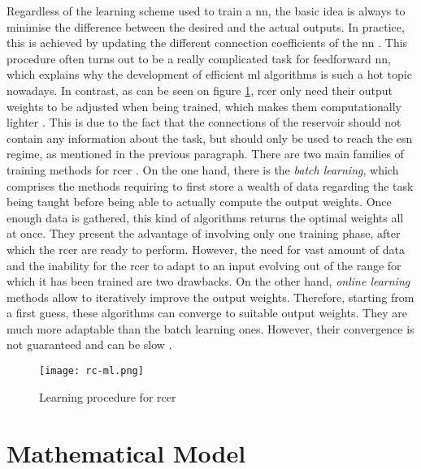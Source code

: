 Regardless of the learning scheme used to train a \gls{nn}, the basic idea is always to minimise the difference between the desired and the actual outputs. In practice, this is achieved by updating the different connection coefficients of the \gls{nn} \cite[p.233]{bishop2006pattern}\cite[p.733]{russell2010artificial}. This procedure often turns out to be a really complicated task for feedforward \gls{nn}, which explains why the development of efficient \gls{ml} algorithms is such a hot topic nowadays. In contrast, as can be seen on figure \ref{rc-ml}, \gls{rcer} only need their output weights to be adjusted when being trained, which makes them computationally lighter \cite{Jaeger2004}. This is due to the fact that the connections of the reservoir should not contain any information about the task, but should only be used to reach the \gls{esn} regime, as mentioned in the previous paragraph. There are two main families of training methods for \gls{rcer} \cite{Jaeger2002}. On the one hand, there is the \textit{batch learning}, which comprises the methods requiring to first store a wealth of data regarding the task being taught before being able to actually compute the output weights. Once enough data is gathered, this kind of algorithms returns the optimal weights all at once. They present the advantage of involving only one training phase, after which the \gls{rcer} are ready to perform. However, the need for vast amount of data and the inability for the \gls{rcer} to adapt to an input evolving out of the range for which it has been trained are two drawbacks. On the other hand, \textit{online learning} methods allow to iteratively improve the output weights. Therefore, starting from a first guess, these algorithms can converge to suitable output weights. They are much more adaptable than the batch learning ones. However, their convergence is not guaranteed and can be slow \cite{JaegerTraining, schrauwen}.

\begin{figure}[h]
	\centering
	\texttt{[image: rc-ml.png]}
	\caption{Learning procedure for \acrlong{rcer} \cite{Goudarzi2014ACS}}
	\label{rc-ml}
\end{figure}


\section{Mathematical Model}

\label{rc-mathematical-model}

